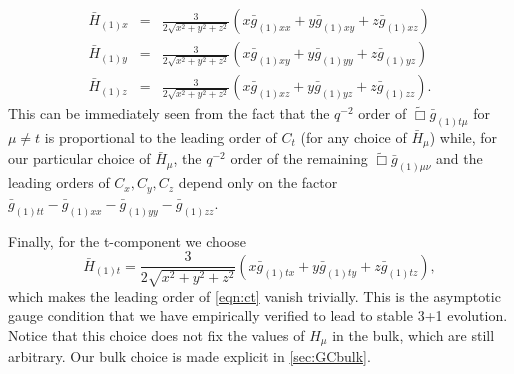 \documentclass[a4paper,11pt]{article}
\numberwithin{equation}{section}
\begin{document}
\begin{eqnarray}\label{eqn:target_gauge_xyz}
\bar{H}_{(1)x}&=&\frac{3}{2\sqrt{x^2+y^2+z^2}}(x \bar{g}_{(1)xx}+y\bar{g}_{(1)xy}+z\bar{g}_{(1)xz}) \nonumber \\
\bar{H}_{(1)y}&=&\frac{3}{2\sqrt{x^2+y^2+z^2}}(x \bar{g}_{(1)xy}+y\bar{g}_{(1)yy}+z\bar{g}_{(1)yz}) \nonumber \\
\bar{H}_{(1)z}&=&\frac{3}{2\sqrt{x^2+y^2+z^2}}(x \bar{g}_{(1)xz}+y\bar{g}_{(1)yz}+z\bar{g}_{(1)zz}).
\end{eqnarray}
This can be immediately seen from the fact that the $q^{-2}$ order of $\tilde{\Box}\bar{g}_{(1)t\mu}$ for $\mu\neq t$ is proportional to the leading order of $C_t$ (for any choice of $\bar{H}_\mu$) while, for our particular choice of $\bar{H}_\mu$, the $q^{-2}$ order of the remaining $\tilde{\Box}\bar{g}_{(1)\mu\nu}$ and the leading orders of $C_x,C_y,C_z$ depend only on the factor $\bar{g}_{(1)tt}-\bar{g}_{(1)xx}-\bar{g}_{(1)yy}-\bar{g}_{(1)zz}$.

Finally, for the t-component we choose
\begin{equation}\label{eqn:target_gauge_t}
\bar{H}_{(1)t}=\frac{3}{2\sqrt{x^2+y^2+z^2}}(x \bar{g}_{(1)tx}+y\bar{g}_{(1)ty}+z\bar{g}_{(1)tz}),
\end{equation}
which makes the leading order of \eqref{eqn:ct} vanish trivially.
This is the asymptotic gauge condition that we have empirically verified to lead to stable 3+1 evolution. Notice that this choice does not fix the values of $H_\mu$ in the bulk, which are still arbitrary. Our bulk choice is made explicit in \ref{sec:GCbulk}.
\end{document}
